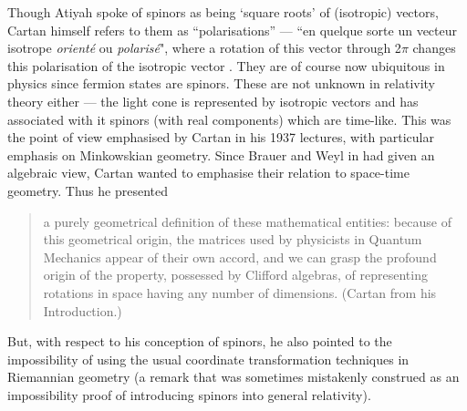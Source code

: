 \documentclass[11pt,oneside,a4paper]{article}
\begin{document}
Though Atiyah spoke of spinors as being `square roots' of (isotropic) vectors, Cartan himself refers to them as ``polarisations'' --- ``en quelque sorte un vecteur isotrope \textit{orienté} ou \textit{polarisé}", where a rotation of this vector through 2$\pi$ changes this polarisation of the isotropic vector \parencite[42]{cartan_theory_1966}. They are of course now ubiquitous in physics since fermion states are spinors. These are not unknown in relativity theory either --- the light cone is represented by isotropic vectors and has associated with it spinors (with real components) which are time-like. This was the point of view emphasised by Cartan in his 1937 lectures, with particular emphasis on Minkowskian geometry. Since Brauer and Weyl in \parencite*{brauer_spinors_1935} had given an algebraic view, Cartan wanted to emphasise their relation to space-time geometry. Thus he presented 
\begin{quotation}\noindent
\xelip a purely geometrical definition of these mathematical entities: because of this geometrical origin, the matrices used by physicists in Quantum Mechanics appear of their own accord, and we can grasp the profound origin of the property, possessed by Clifford algebras, of representing rotations in space having any number of dimensions. (Cartan \parencite*{cartan_theory_1966} from his Introduction.)
\end{quotation}
But, with respect to his conception of spinors, he also pointed to the impossibility of using the usual coordinate transformation techniques in Riemannian geometry (a remark that was sometimes mistakenly construed as an impossibility proof of introducing spinors into general relativity).
\end{document}

